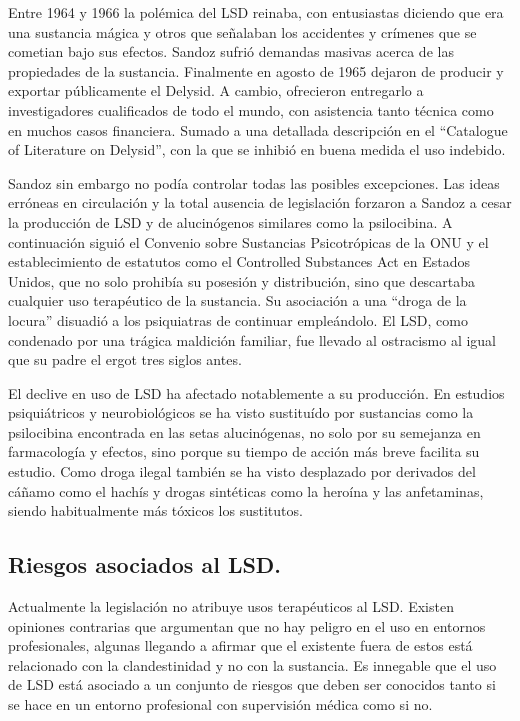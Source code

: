 Entre 1964 y 1966 la polémica del LSD reinaba, con entusiastas diciendo que era una sustancia mágica y otros que señalaban los accidentes y crímenes que se cometian bajo sus efectos. Sandoz sufrió demandas masivas acerca de las propiedades de la sustancia. Finalmente en agosto de 1965 dejaron de producir y exportar públicamente el Delysid. A cambio, ofrecieron entregarlo a investigadores cualificados de todo el mundo, con asistencia tanto técnica como en muchos casos financiera. Sumado a una detallada descripción en el \enquote{Catalogue of Literature on Delysid}, con la que se inhibió en buena medida el uso indebido.

Sandoz sin embargo no podía controlar todas las posibles excepciones. Las ideas erróneas en circulación y la total ausencia de legislación forzaron a Sandoz a cesar la producción de LSD y de alucinógenos similares como la psilocibina. A continuación siguió el Convenio sobre Sustancias Psicotrópicas de la ONU y el establecimiento de estatutos como el Controlled Substances Act en Estados Unidos, que no solo prohibía su posesión y distribución, sino que descartaba cualquier uso terapéutico de la sustancia. Su asociación a una \enquote{droga de la locura} disuadió a los psiquiatras de continuar empleándolo. El LSD, como condenado por una trágica maldición familiar, fue llevado al ostracismo al igual que su padre el ergot tres siglos antes.

El declive en uso de LSD ha afectado notablemente a su producción. En estudios psiquiátricos y neurobiológicos se ha visto sustituído por sustancias como la psilocibina encontrada en las setas alucinógenas, no solo por su semejanza en farmacología y efectos, sino porque su tiempo de acción más breve facilita su estudio. Como droga ilegal también se ha visto desplazado por derivados del cáñamo como el hachís y drogas sintéticas como la heroína y las anfetaminas, siendo habitualmente más tóxicos los sustitutos.

\subsection{Riesgos asociados al LSD.}

Actualmente la legislación no atribuye usos terapéuticos al LSD. Existen opiniones contrarias que argumentan que no hay peligro en el uso en entornos profesionales, algunas llegando a afirmar que el existente fuera de estos está relacionado con la clandestinidad y no con la sustancia. Es innegable que el uso de LSD está asociado a un conjunto de riesgos que deben ser conocidos tanto si se hace en un entorno profesional con supervisión médica como si no.

